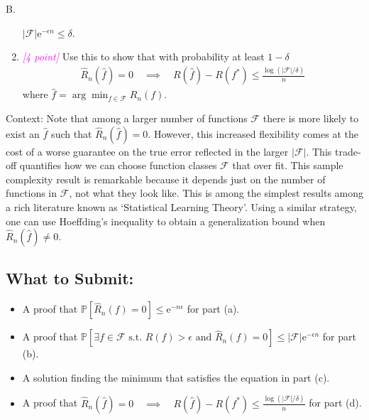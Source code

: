 \documentclass{article}
\newcommand{\1}{\mathbf{1}}
\renewcommand{\P}{\mathbb{P}}
\providecommand*{\eu}{\ensuremath{\mathrm{e}}}
\newcommand{\points}[1]{\small\textcolor{magenta}{\emph{[#1 point\ifthenelse{\equal{#1}{1}}{}{s}]}} \normalsize}
\newcounter{bprob}
\newenvironment{bprob}[1][]{\begin{mdframed} \refstepcounter{bprob}\par\medskip
  B\thebprob.#1 }
   { \end{mdframed} }
\begin{document}
\begin{bprob}
\begin{enumerate}
$\lvert \mathcal{F}\rvert \eu^{-\epsilon n} \le \delta$. 
\item \points{4} Use this to show that with probability at least $1-\delta$ 
\begin{align*}
    \widehat{R}_n(\widehat{f})=0 \quad \implies \quad  R(\widehat f) - R\left(f^*\right) \leq \frac{\log(\lvert\mathcal{F}\rvert/\delta)}{n}
\end{align*}
where $\widehat f = \arg\min_{f\in\mathcal{F}} \widehat R_n(f)$.
\end{enumerate}
Context: 
Note that among a larger number of functions $\mathcal{F}$ there is more likely to exist an $\widehat{f}$ such that $\widehat{R}_n(\widehat{f})=0$. 
However, this increased flexibility comes at the cost of a worse guarantee on the true error reflected in the larger $\lvert \mathcal{F}\rvert$. This trade-off quantifies how we can choose function classes $\mathcal{F}$ that over fit.
This sample complexity result is remarkable because it depends just on the number of functions in $\mathcal{F}$, not what they look like. This is among the simplest results among a rich literature known as `Statistical Learning Theory'.
Using a similar strategy, one can use Hoeffding's inequality to obtain a generalization bound when $\widehat{R}_n(\widehat{f}) \neq 0$.

\subsection*{What to Submit:}

\begin{itemize}
    \item A proof that $\P\left[ \widehat{R}_n(f) = 0 \right] \leq \eu^{-n \epsilon}$ for part (a).
    \item A proof that $\P \left[\exists f \in \mathcal{F}\text{ s.t. } R(f) > \epsilon \text{ and }  \widehat{R}_n(f) = 0 \right] \le \lvert\mathcal{F}\rvert \eu^{-\epsilon n}$ for part (b).
    \item A solution finding the minimum that satisfies the equation in part (c).
    \item A proof that $\widehat{R}_n(\widehat{f})=0 \quad \implies \quad  R(\widehat f) - R\left(f^*\right) \leq \frac{\log(\lvert\mathcal{F}\rvert/\delta)}{n}$ for part (d).
\end{itemize}


\end{bprob}

\newpage
\end{document}
